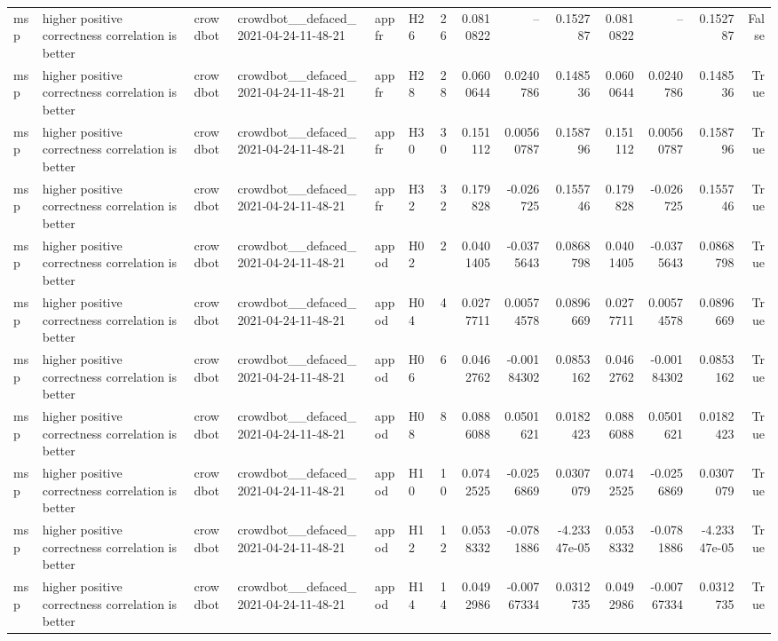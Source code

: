 \begin{longtable}{llllllrrrrrrrr}
msp & higher positive correctness correlation is better & crowdbot & crowdbot\_\_defaced\_2021-04-24-11-48-21 & appfr & H26 & 26 & 0.0810822 & -- & 0.152787 & 0.0810822 & -- & 0.152787 & False \\
msp & higher positive correctness correlation is better & crowdbot & crowdbot\_\_defaced\_2021-04-24-11-48-21 & appfr & H28 & 28 & 0.0600644 & 0.0240786 & 0.148536 & 0.0600644 & 0.0240786 & 0.148536 & True \\
msp & higher positive correctness correlation is better & crowdbot & crowdbot\_\_defaced\_2021-04-24-11-48-21 & appfr & H30 & 30 & 0.151112 & 0.00560787 & 0.158796 & 0.151112 & 0.00560787 & 0.158796 & True \\
msp & higher positive correctness correlation is better & crowdbot & crowdbot\_\_defaced\_2021-04-24-11-48-21 & appfr & H32 & 32 & 0.179828 & -0.026725 & 0.155746 & 0.179828 & -0.026725 & 0.155746 & True \\
msp & higher positive correctness correlation is better & crowdbot & crowdbot\_\_defaced\_2021-04-24-11-48-21 & appod & H02 & 2 & 0.0401405 & -0.0375643 & 0.0868798 & 0.0401405 & -0.0375643 & 0.0868798 & True \\
msp & higher positive correctness correlation is better & crowdbot & crowdbot\_\_defaced\_2021-04-24-11-48-21 & appod & H04 & 4 & 0.0277711 & 0.00574578 & 0.0896669 & 0.0277711 & 0.00574578 & 0.0896669 & True \\
msp & higher positive correctness correlation is better & crowdbot & crowdbot\_\_defaced\_2021-04-24-11-48-21 & appod & H06 & 6 & 0.0462762 & -0.00184302 & 0.0853162 & 0.0462762 & -0.00184302 & 0.0853162 & True \\
msp & higher positive correctness correlation is better & crowdbot & crowdbot\_\_defaced\_2021-04-24-11-48-21 & appod & H08 & 8 & 0.0886088 & 0.0501621 & 0.0182423 & 0.0886088 & 0.0501621 & 0.0182423 & True \\
msp & higher positive correctness correlation is better & crowdbot & crowdbot\_\_defaced\_2021-04-24-11-48-21 & appod & H10 & 10 & 0.0742525 & -0.0256869 & 0.0307079 & 0.0742525 & -0.0256869 & 0.0307079 & True \\
msp & higher positive correctness correlation is better & crowdbot & crowdbot\_\_defaced\_2021-04-24-11-48-21 & appod & H12 & 12 & 0.0538332 & -0.0781886 & -4.23347e-05 & 0.0538332 & -0.0781886 & -4.23347e-05 & True \\
msp & higher positive correctness correlation is better & crowdbot & crowdbot\_\_defaced\_2021-04-24-11-48-21 & appod & H14 & 14 & 0.0492986 & -0.00767334 & 0.0312735 & 0.0492986 & -0.00767334 & 0.0312735 & True \\

\end{longtable}
